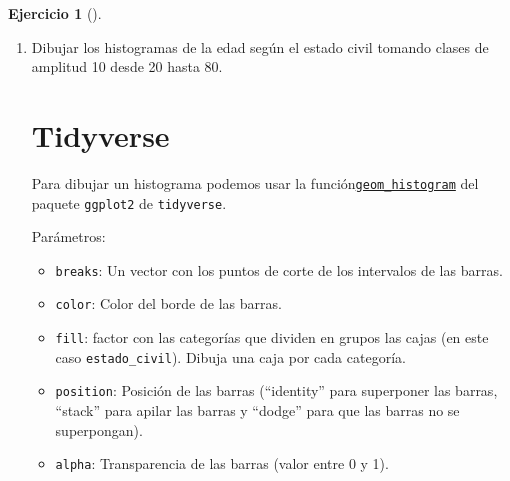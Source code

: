 \documentclass[
  a4paper,
]{scrreport}
\newenvironment{Shaded}{\begin{snugshade}}{\end{snugshade}}
\newcommand{\ExtensionTok}[1]{\textcolor[rgb]{0.00,0.23,0.31}{#1}}
\newcommand{\NormalTok}[1]{\textcolor[rgb]{0.00,0.23,0.31}{#1}}
\providecommand{\tightlist}{%
  \setlength{\itemsep}{0pt}\setlength{\parskip}{0pt}}\usepackage{longtable,booktabs,array}
\theoremstyle{definition}
\newtheorem{exercise}{Ejercicio}[chapter]
\theoremstyle{remark}
\begin{document}
\begin{exercise}[]
\begin{enumerate}
\begin{tcolorbox}
  \section{Copilot}

\begin{Shaded}
\begin{Highlighting}[]
\ExtensionTok{Dibujar}\NormalTok{ un diagrama de cajas de la columna edad según las categorías de la columna estado\_civil del data frame df. Usar un color diferente para cada categoría de la columna estado\_civil.}
\end{Highlighting}
\end{Shaded}

  \end{tcolorbox}
\item
  Dibujar los histogramas de la edad según el estado civil tomando
  clases de amplitud 10 desde 20 hasta 80.

  \begin{tcolorbox}[enhanced jigsaw, colframe=quarto-callout-tip-color-frame, toprule=.15mm, bottomtitle=1mm, breakable, opacitybacktitle=0.6, toptitle=1mm, colback=white, bottomrule=.15mm, title=\textcolor{quarto-callout-tip-color}{\faLightbulb}\hspace{0.5em}{Solución}, arc=.35mm, left=2mm, titlerule=0mm, rightrule=.15mm, coltitle=black, leftrule=.75mm, opacityback=0, colbacktitle=quarto-callout-tip-color!10!white]

  \section{Tidyverse}

  Para dibujar un histograma podemos usar la
  función\href{https://aprendeconalf.es/manual-r/07-graficos.html\#histogramas}{\texttt{geom\_histogram}}
  del paquete \texttt{ggplot2} de \texttt{tidyverse}.

  Parámetros:

  \begin{itemize}
  \tightlist
  \item
    \texttt{breaks}: Un vector con los puntos de corte de los intervalos
    de las barras.
  \item
    \texttt{color}: Color del borde de las barras.
  \item
    \texttt{fill}: factor con las categorías que dividen en grupos las
    cajas (en este caso \texttt{estado\_civil}). Dibuja una caja por
    cada categoría.
  \item
    \texttt{position}: Posición de las barras (``identity'' para
    superponer las barras, ``stack'' para apilar las barras y ``dodge''
    para que las barras no se superpongan).
  \item
    \texttt{alpha}: Transparencia de las barras (valor entre 0 y 1).
  \end{itemize}


\end{tcolorbox}
\end{enumerate}
\end{exercise}
\end{document}
